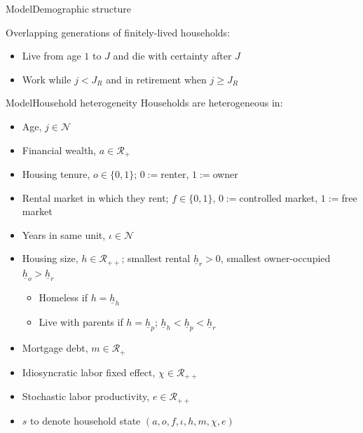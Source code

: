 \documentclass[11pt,aspectratio=169]{beamer}
\begin{document}
\begin{frame}{Model}{Demographic structure}

Overlapping generations of finitely-lived households:
\begin{itemize}
    \item Live from age $1$ to $J$ and die with certainty after $J$
    \item Work while $j<J_{R}$ and in retirement when $j\geq J_{R}$
\end{itemize}

\end{frame}


\begin{frame}{Model}{Household heterogeneity}
Households are heterogeneous in:
\begin{itemize}
    \item Age, $j \in \mathcal{N}$
    \item Financial wealth, $a \in \mathcal{R_{+}}$
    \item Housing tenure, $o \in \{0,1\}$; $0:=$renter, $1:=$owner
    \item Rental market in which they rent; $f \in \{0,1\}$, $0:=$controlled market, $1:=$free market
    \item Years in same unit, $\iota \in \mathcal{N}$
    \item Housing size, $h \in \mathcal{R_{++}}$; smallest rental $\underline{h}_{r}>0$, smallest owner-occupied $\underline{h}_{o}>\underline{h}_{r}$
    \begin{itemize}
        \item Homeless if $h=\underline{h}_{h}$
        \item Live with parents if $h=\underline{h}_{p}$; $\underline{h}_{h}<\underline{h}_{p}<\underline{h}_{r}$
    \end{itemize}
    \item Mortgage debt, $m \in \mathcal{R_{+}}$
    \item Idiosyncratic labor fixed effect, $\chi \in \mathcal{R_{++}}$
    \item Stochastic labor productivity, $e \in \mathcal{R_{++}}$
    \item $s$ to denote household state $(a,o,f,\iota,h,m,\chi,e)$
\end{itemize}

\end{frame}

\end{document}
